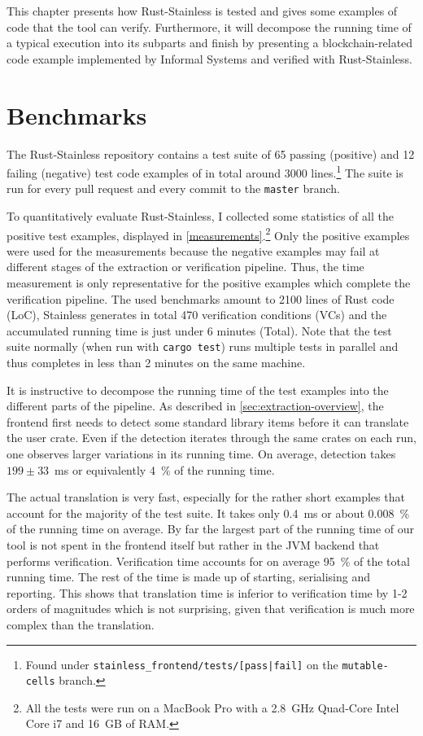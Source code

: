 This chapter presents how Rust-Stainless is tested and gives some examples of
code that the tool can verify. Furthermore, it will decompose the running time
of a typical execution into its subparts and finish by presenting a
blockchain-related code example implemented by Informal Systems and verified
with Rust-Stainless.

\section{Benchmarks}

The Rust-Stainless repository contains a test suite of 65 passing (positive) and
12 failing (negative) test code examples of in total around 3000
lines.\footnote{Found under \texttt{stainless\_frontend/tests/[pass|fail]} on
the \texttt{mutable-cells} branch.} The suite is run for every pull request and
every commit to the \texttt{master} branch.

To quantitatively evaluate Rust-Stainless, I collected some statistics of all
the positive test examples, displayed in \autoref{measurements}.\footnote{All
the tests were run on a MacBook Pro with a 2.8~GHz Quad-Core Intel Core i7 and
16~GB of RAM.} Only the positive examples were used for the measurements because
the negative examples may fail at different stages of the extraction or
verification pipeline. Thus, the time measurement is only representative for the
positive examples which complete the verification pipeline. The used benchmarks
amount to 2100 lines of Rust code (LoC), Stainless generates in total 470
verification conditions (VCs) and the accumulated running time is just under 6
minutes (Total). Note that the test suite normally (when run with \texttt{cargo
test}) runs multiple tests in parallel and thus completes in less than 2 minutes
on the same machine.

It is instructive to decompose the running time of the test examples into the
different parts of the pipeline. As described in
\autoref{sec:extraction-overview}, the frontend first needs to detect some
standard library items before it can translate the user crate. Even if the
detection iterates through the same crates on each run, one observes larger
variations in its running time. On average, detection takes $199 \pm 33$~ms or
equivalently 4~\% of the running time.

The actual translation is very fast, especially for the rather short examples
that account for the majority of the test suite. It takes only 0.4~ms or about
0.008~\% of the running time on average. By far the largest part of the running
time of our tool is not spent in the frontend itself but rather in the JVM
backend that performs verification. Verification time accounts for on average
95~\% of the total running time. The rest of the time is made up of starting,
serialising and reporting. This shows that translation time is inferior to
verification time by 1-2 orders of magnitudes which is not surprising, given
that verification is much more complex than the translation.

